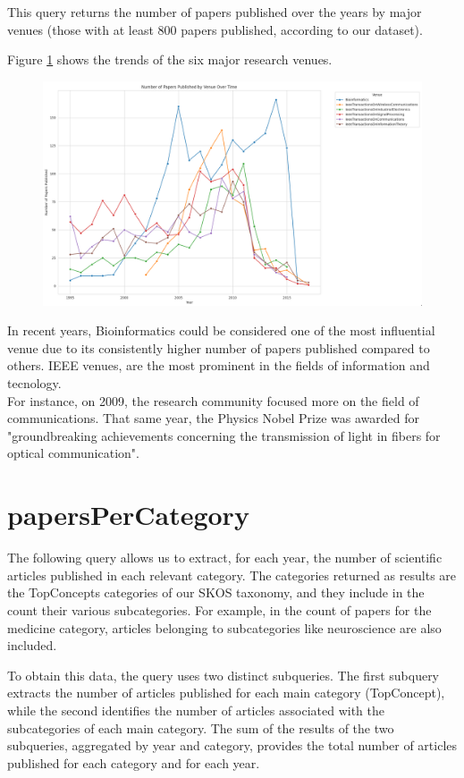 \documentclass{article}
\begin{document}
This query returns the number of papers published over the years by major
venues (those with at least 800 papers published, according to our dataset).

Figure \ref{fig:papersPerVenue} shows the trends of the six major research venues.

\begin{figure}[H]
	\centering
	\label{fig:papersPerVenue}
	\includegraphics[width=\textwidth]{../queries/plots/papersPerVenue.png}
\end{figure}

In recent years, Bioinformatics could be considered one of the most influential
venue due to its consistently higher number of papers published compared to others.
IEEE venues, are the most prominent in the fields of information and tecnology.\\
For instance, on 2009, the research community focused more on the field of
communications.
That same year, the Physics Nobel Prize was awarded for "groundbreaking achievements
concerning the transmission of light in fibers for optical communication".

\section{papersPerCategory}
The following query allows us to extract, for each year, the number of scientific articles published in each relevant category. The categories returned
as results are the TopConcepts categories of our SKOS taxonomy, and they include in the count their various subcategories. For example, in the count
of papers for the medicine category, articles belonging to subcategories like neuroscience are also included.

\noindent To obtain this data, the query uses two distinct subqueries. The first subquery extracts the number of articles published for each main category
(TopConcept), while the second identifies the number of articles associated with the subcategories of each main category. The sum of the results of
the two subqueries, aggregated by year and category, provides the total number of articles published for each category and for each year.
\end{document}
